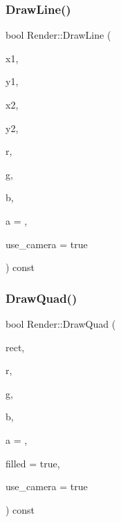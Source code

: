 \mbox{\label{class_render_a4c933fac2d01946be59a70c56eafdba1}} 
\subsubsection{\texorpdfstring{DrawLine()}{DrawLine()}}
{\footnotesize\ttfamily bool Render\+::\+Draw\+Line (\begin{DoxyParamCaption}\item[{int}]{x1,  }\item[{int}]{y1,  }\item[{int}]{x2,  }\item[{int}]{y2,  }\item[{Uint8}]{r,  }\item[{Uint8}]{g,  }\item[{Uint8}]{b,  }\item[{Uint8}]{a = {},  }\item[{bool}]{use\+\_\+camera = {\ttfamily true} }\end{DoxyParamCaption}) const}

\mbox{\label{class_render_a3ee73433ddaacb7325dca11d5a262a18}} 
\subsubsection{\texorpdfstring{DrawQuad()}{DrawQuad()}}
{\footnotesize\ttfamily bool Render\+::\+Draw\+Quad (\begin{DoxyParamCaption}\item[{const S\+D\+L\+\_\+\+Rect \&}]{rect,  }\item[{Uint8}]{r,  }\item[{Uint8}]{g,  }\item[{Uint8}]{b,  }\item[{Uint8}]{a = {},  }\item[{bool}]{filled = {\ttfamily true},  }\item[{bool}]{use\+\_\+camera = {\ttfamily true} }\end{DoxyParamCaption}) const}

\mbox{\label{class_render_a3ebd83e75f2168779adb605ff25aff37}} 
